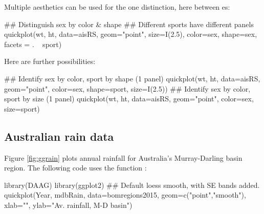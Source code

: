 Multiple aesthetics can be used for the one distinction, here
between es:
\begin{Schunk}
\begin{Sinput}
## Distinguish sex by color & shape
## Different sports have different panels
quickplot(wt, ht, data=aisRS, geom="point",
          size=I(2.5), color=sex, shape=sex,
          facets = . ~ sport)
\end{Sinput}
\end{Schunk}

Here are further possibilities:
\begin{Schunk}
\begin{Sinput}
## Identify sex by color, sport by shape (1 panel)
quickplot(wt, ht, data=aisRS, geom="point",
           color=sex, shape=sport, size=I(2.5))
## Identify sex by color, sport by size (1 panel)
quickplot(wt, ht, data=aisRS, geom="point",
          color=sex, size=sport)
\end{Sinput}
\end{Schunk}

\subsection*{Australian rain data}

 Figure \ref{fig:ggrain} plots annual rainfall for Australia's
 Murray-Darling basin region. The following code uses the
 function :

\begin{Schunk}
\begin{Sinput}
library(DAAG)
library(ggplot2)
## Default loess smooth, with SE bands added.
quickplot(Year, mdbRain, data=bomregions2015,
          geom=c("point","smooth"), xlab="",
          ylab="Av. rainfall, M-D basin")
\end{Sinput}
\end{Schunk}

